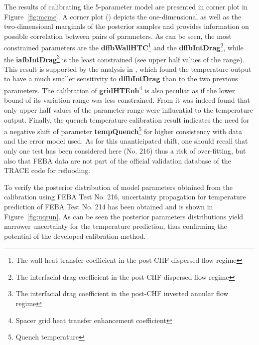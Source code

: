 \documentclass[11pt,titlepage]{article}
\begin{document}
The results of calibrating the 5-parameter model are presented in corner 
plot in Figure~\ref{fig:mcmc}. 
A corner plot (\cite{Foreman-Mackey2016}) depicts the one-dimensional 
as well as the two-dimensional marginals of the posterior samples and provides 
information on possible correlation between pairs of parameters. 
As can be seen, the most constrained parameters are the 
\textbf{dffbWallHTC}\footnote{The wall heat transfer coefficient in the post-CHF dispersed flow regime}  
and the \textbf{dffbIntDrag}\footnote{The interfacial drag coefficient in the post-CHF dispersed flow regime}, 
while the \textbf{iafbIntDrag}\footnote{The interfacial drag coefficient in the post-CHF inverted annular flow regime} 
is the least constrained (see upper half values of the range).
This result is supported by the analysis in \cite{Wicaksono2015b}, 
which found the temperature output to have a much smaller sensitivity to 
\textbf{dffbIntDrag} than to the two previous parameters. 
The calibration of \textbf{gridHTEnh}\footnote{Spacer grid heat transfer enhancement coefficient} 
is also peculiar as if the lower bound of its variation range was less 
constrained.
From \cite{Wicaksono2014b} it was indeed found that only upper half values of 
the parameter range were influential to the temperature output. 
Finally, the quench temperature calibration result indicates the need for a 
negative shift of parameter \textbf{tempQuench}\footnote{Quench temperature} 
for higher consistency with data and the error model used. 
As for this unanticipated shift, one should recall that only one test 
has been considered here (No. 216) thus a risk of over-fitting, 
but also that FEBA data are not part of the official validation database of 
the TRACE code for reflooding. 

To verify the posterior distribution of model parameters obtained from the 
calibration using FEBA Test No. 216, uncertainty propagation for temperature 
prediction of FEBA Test No. 214 has been obtained and is shown in 
Figure~\ref{fig:uqrun}. 
As can be seen the posterior parameters distributions yield narrower 
uncertainty for the temperature prediction, thus confirming the potential 
of the developed calibration method.
\end{document}
